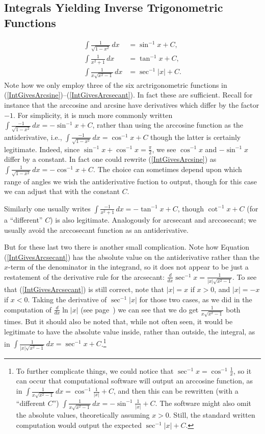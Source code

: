 \subsection{Integrals Yielding Inverse Trigonometric Functions}


\begin{align}
\int\frac1{\sqrt{1-x^2}}\,dx&=\sin^{-1}x+C,\label{IntGivesArcsine}\\
\int\frac1{x^2+1}\,dx&=\tan^{-1}x+C,\\
\int\frac1{x{\sqrt{x^2-1}}}\,dx&=\sec^{-1}|x|+C.\label{IntGivesArcsecant}
\end{align}
Note how we only employ three of the six arctrigonometric functions
in (\ref{IntGivesArcsine})--(\ref{IntGivesArcsecant}).  In fact
these are sufficient.
Recall for instance
that the arccosine and arcsine have derivatives which differ by the 
factor $-1$.  For simplicity, it is much more commonly written 
$\int\frac{-1}{\sqrt{1-x^2}}\,dx=-\sin^{-1}x+C$, rather than
using the arccosine function as the antiderivative,
i.e.,  $\int\frac{-1}{\sqrt{1-x^2}}\,dx=\cos^{-1}x+C$
though the latter is certainly legitimate.  Indeed,
since $\sin^{-1}x+\cos^{-1}x=\frac{\pi}2$, we see
$\cos^{-1}x$ and $-\sin^{-1}x$ differ by a constant.  In fact
one could rewrite (\ref{IntGivesArcsine}) as
$\int\frac1{\sqrt{1-x^2}}\,dx=-\cos^{-1}x+C$.  The choice can
sometimes depend upon which range of angles we wish the antiderivative
fuction to output, though for this case
we can adjust that with the constant $C$.



Similarly one usually writes $\int\frac{-1}{x^2+1}\,dx=-\tan^{-1}x+C$, 
though $\cot^{-1}x+C$ (for a ``different'' $C$) is also legitimate.
Analogously for arcsecant and arccosecant; we usually avoid the arccosecant
function as an antiderivative.
  
But for these last two there is another small complication.  Note how
Equation (\ref{IntGivesArcsecant}) has the absolute value on the 
antiderivative rather than the $x$-term of the denominator in the integrand,
so it does not appear to be just a restatement of the derivative rule
for the arcsecant: $\frac{d}{dx}\sec^{-1}x=\frac1{|x|\sqrt{x^2-1}}$.
To see that (\ref{IntGivesArcsecant}) is still correct,
note that $|x|=x$ if $x>0$, and $|x|=-x$ if $x<0$.  Taking the derivative of
$\sec^{-1}|x|$ for those two cases, as we did in the computation
of $\frac{d}{dx}\ln|x|$  (see page~\pageref{ProofOfDerivLn|X|Stuff})
we can see that we do get 
$\frac1{x\sqrt{x^2-1}}$ both times.  But it should also be noted that,
while not often seen, it would be legitimate to have the 
absolute value inside, rather than outside, the integral, as 
in
$\int\frac1{|x|\sqrt{x^2-1}}\,dx=\sec^{-1}x+C$.\footnote{%
To further complicate things, we could notice that
$\sec^{-1}x=\cos^{-1}\frac1x$, so it can occur that computational
software will output an arccosine function, as 
in $\int\frac1{x\sqrt{x^2-1}}\,dx=\cos^{-1}\frac1{|x|}+C$,
and then this can be rewritten (with a ``different $C$'')
$\int\frac1{x\sqrt{x^2-1}}\,dx=-\sin^{-1}\frac1{|x|}+C$.
The software might also 
omit the absolute values, theoretically assuming $x>0$.
Still, the standard written
computation would output the expected $\sec^{-1}|x|+C$.
}


